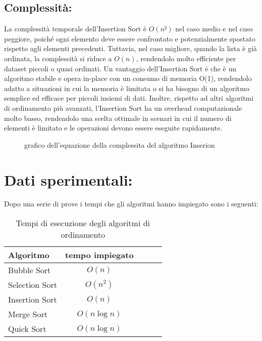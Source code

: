 \documentclass[a4paper]{article}
\begin{document}
\subsection{Complessità:}
La complessità temporale dell’Insertion Sort è \(O(n²)\) nel caso medio e nel caso peggiore, poiché ogni elemento deve essere confrontato e potenzialmente
spostato rispetto agli elementi precedenti. Tuttavia, nel caso migliore, quando la lista è già ordinata, la complessità si riduce a \(O(n)\), rendendolo
molto efficiente per dataset piccoli o quasi ordinati. Un vantaggio dell’Insertion Sort è che è un algoritmo stabile e opera in-place con un consumo 
di memoria O(1), rendendolo adatto a situazioni in cui la memoria è limitata o si ha bisogno di un algoritmo semplice ed efficace per piccoli insiemi 
di dati. Inoltre, rispetto ad altri algoritmi di ordinamento più avanzati, l'Insertion Sort ha un overhead computazionale molto basso, rendendolo una 
scelta ottimale in scenari in cui il numero di elementi è limitato e le operazioni devono essere eseguite rapidamente.
\begin{figure}[h]
    \caption{grafico dell'equazione della complessita del algoritmo Inserion}
\end{figure}
\section{Dati sperimentali:}
Dopo una serie di prove i tempi che gli algoritmi hanno impiegato sono i seguenti:
\begin{table}[h]
    \centering
    \caption{Tempi di esecuzione degli algoritmi di ordinamento}
    \begin{tabular}{lcccc}
    \toprule
    \textbf{Algoritmo} & \textbf{tempo impiegato} \\
    \midrule
    Bubble Sort & $O(n)$ \\
    Selection Sort & $O(n^2)$ \\
    Insertion Sort & $O(n)$ \\
    Merge Sort & $O(n \log n)$ \\
    Quick Sort & $O(n \log n)$ \\
    \bottomrule
    \end{tabular}
    \label{tab:sorting-algorithms}
\end{table}
\end{document}

